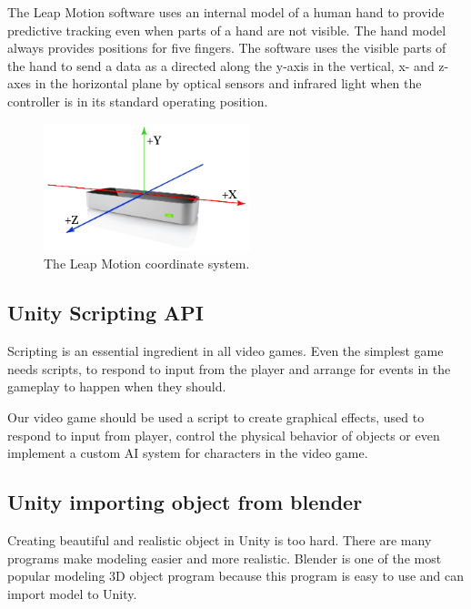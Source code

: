 \documentclass[journal]{IEEEtran}										    %
\begin{document}
                The Leap Motion software uses an internal model of a human hand 
                to provide predictive tracking even when parts of a hand are not 
                visible. The hand model always provides positions for five fingers. 
                The software uses the visible parts of the hand to send a data 
                as a directed along the y-axis in the vertical, x- and z-axes 
                in the horizontal plane by optical sensors and infrared light 
                when the controller is in its standard operating position.

                \begin{figure}[h]
                    \centering
                    \includegraphics[width=6cm]{Leap-Axes}
                    \caption{The Leap Motion coordinate system. \cite{TAG11}}
                    \label{fig:leap1}
                \end{figure}
            
            \subsection{Unity Scripting API}
                Scripting is an essential ingredient in all video games. Even 
                the simplest game needs scripts, to respond to input from 
                the player and arrange for events in the gameplay to happen when 
                they should. 

                Our video game should be used a script to create graphical effects, 
                used to respond to input from player, control the physical behavior 
                of objects or even implement a custom AI system for characters 
                in the video game.
            
            \subsection{Unity importing object from blender}
                Creating beautiful and realistic object in Unity is too hard. 
                There are many programs make modeling easier and more realistic. 
                Blender is one of the most popular modeling 3D object program 
                because this program is easy to use and can import model to Unity.
\end{document}
